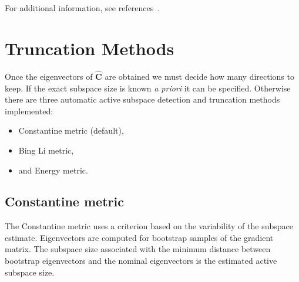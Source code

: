 For additional information, see references~\cite{Constantine-preprint-active,constantine2014active,constantine2015active}.

\section{Truncation Methods}\label{Sec:trunc}
Once the eigenvectors of $\hat{\mathbf{C}}$ are obtained we must decide how many
directions to keep. If the exact subspace size is known \textit{a priori} it can be
specified. Otherwise there are three automatic active subspace detection and
truncation methods implemented:
\begin{itemize}
\item Constantine metric (default),
\item Bing Li metric,
\item and Energy metric.
\end{itemize}

\subsection{Constantine metric}\label{SubSec:constantine}
The Constantine metric uses a criterion based on the variability of the subspace estimate. 
Eigenvectors are computed for bootstrap samples of the gradient matrix. The 
subspace size associated with the minimum distance between bootstrap 
eigenvectors and the nominal eigenvectors is the estimated active subspace
size.

